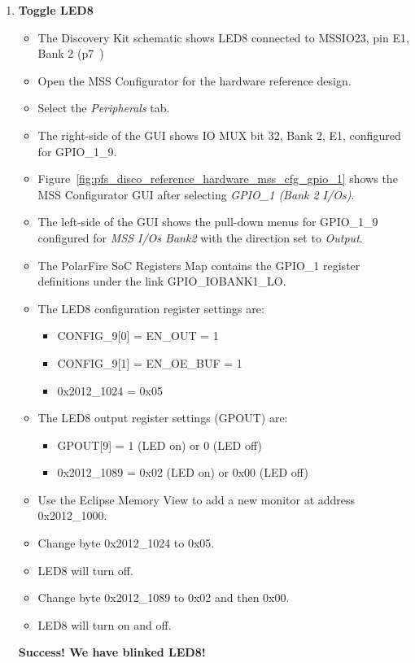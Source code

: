 \begin{enumerate}
\item \textbf{Toggle LED8}
%
\begin{itemize}
\item The Discovery Kit schematic shows LED8 connected to MSSIO23, pin E1, Bank 2 (p7~\cite{Microchip_DISCO_SCH_2023})
\item Open the MSS Configurator for the hardware reference design.
\item Select the \emph{Peripherals} tab.
\item The right-side of the GUI shows IO MUX bit 32, Bank 2, E1, configured for GPIO\_1\_9.
\item Figure~\ref{fig:pfs_disco_reference_hardware_mss_cfg_gpio_1} shows the MSS Configurator GUI after
selecting \emph{GPIO\_1 (Bank 2 I/Os)}.
\item The left-side of the GUI shows the pull-down menus for GPIO\_1\_9 configured for
\emph{MSS I/Os Bank2} with the direction set to \emph{Output}.
\item The PolarFire SoC Registers Map contains the GPIO\_1 register definitions under
the link GPIO\_IOBANK1\_LO.
\item The LED8 configuration register settings are:
\begin{itemize}
\item CONFIG\_9[0] = EN\_OUT = 1
\item CONFIG\_9[1] = EN\_OE\_BUF = 1
\item 0x2012\_1024 = 0x05
\end{itemize}
%
\item The LED8 output register settings (GPOUT) are:
\begin{itemize}
\item GPOUT[9] = 1 (LED on) or 0 (LED off)
\item 0x2012\_1089 = 0x02 (LED on) or 0x00 (LED off)
\end{itemize}
%
\item Use the Eclipse Memory View to add a new monitor at address 0x2012\_1000.
\item Change byte 0x2012\_1024 to 0x05.
\item LED8 will turn off.
\item Change byte 0x2012\_1089 to 0x02 and then 0x00.
\item LED8 will turn on and off.
\end{itemize}
\textcolor{OliveGreen}{\bf Success! We have blinked LED8!}


\end{enumerate}
